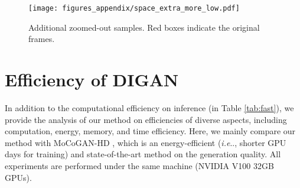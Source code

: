 \documentclass{article} \usepackage{iclr2022_conference,times}
\makeatletter
\DeclareRobustCommand\onedot{\futurelet\@let@token\@onedot}
\def\@onedot{\ifx\@let@token.\else.\null\fi\xspace}
\def\ie{\emph{i.e}\onedot} \def\Ie{\emph{I.e}\onedot}
\makeatother
\begin{document}
\begin{figure*}[h]
\centering
\texttt{[image: figures\_appendix/space\_extra\_more\_low.pdf]}
\caption{
Additional zoomed-out samples. Red boxes indicate the original frames.
}\label{fig:more_space_extra}
\end{figure*}
 
\clearpage
\section{Efficiency of DIGAN}
\label{appen:efficieny}

In addition to the computational efficiency on inference (in Table \ref{tab:fast}), we provide the analysis of our method on efficiencies of diverse aspects, including computation, energy, memory, and time efficiency. Here, we mainly compare our method with MoCoGAN-HD \citep{tian2021good}, which is an energy-efficient (\ie, shorter GPU days for training) and state-of-the-art method on the generation quality. All experiments are performed under the same machine (NVIDIA V100 32GB GPUs).
\end{document}
